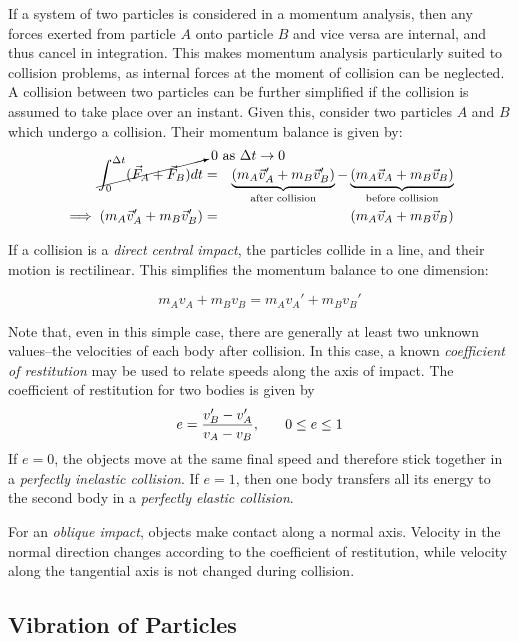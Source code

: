If a system of two particles is considered in a momentum analysis, then any forces exerted from particle $A$ onto particle $B$ and vice versa are internal, and thus cancel in integration. This makes momentum analysis particularly suited to collision problems, as internal forces at the moment of collision can be neglected. A collision between two particles can be further simplified if the collision is assumed to take place over an instant. Given this, consider two particles $A$ and $B$ which undergo a collision. Their momentum balance is given by: \begin{eqnarray*}
    \cancelto{0\text{ as }\Delta t\to 0}{\int_0^{\Delta t} (\vec{F}_A + \vec{F}_B)dt} &=& \underbrace{(m_A\vec{v}_A' +m_B\vec{v}_B')}_\text{after collision} - \underbrace{(m_A\vec{v}_A + m_B\vec{v}_B)}_\text{before collision}\\
    \implies (m_A\vec{v}_A' +m_B\vec{v}_B') &=& (m_A\vec{v}_A + m_B\vec{v}_B)
\end{eqnarray*}

If a collision is a \textit{direct central impact}, the particles collide in a line, and their motion is rectilinear. This simplifies the momentum balance to one dimension:

\[m_Av_A + m_Bv_B = m_Av_A' + m_Bv_B'\]

Note that, even in this simple case, there are generally at least two unknown values--the velocities of each body after collision. In this case, a known \textit{coefficient of restitution} may be used to relate speeds along the axis of impact. The coefficient of restitution for two bodies is given by \[e = \frac{v_B'-v_A'}{v_A-v_B},\hspace{0.25in}0\leq e\leq 1\]
If $e=0$, the objects move at the same final speed and therefore stick together in a \textit{perfectly inelastic collision}. If $e=1$, then one body transfers all its energy to the second body in a \textit{perfectly elastic collision}.

For an \textit{oblique impact}, objects make contact along a normal axis. Velocity in the normal direction changes according to the coefficient of restitution, while velocity along the tangential axis is not changed during collision.

\newpage

\subsection{Vibration of Particles} %

